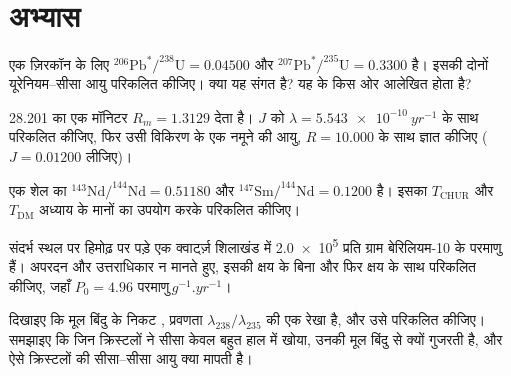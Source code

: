 \section{अभ्यास}

\begin{exercise}[$\star$]\label{exo:b3:advanced-geochronology:1}
एक ज़िरकॉन के लिए $^{206}\mathrm{Pb}^*/^{238}\mathrm{U} = 0.04500$ और
$^{207}\mathrm{Pb}^*/^{235}\mathrm{U} = 0.3300$ है। इसकी दोनों यूरेनियम--सीसा
आयु परिकलित कीजिए। क्या यह संगत है? यह  के किस ओर
आलेखित होता है?
\end{exercise}

\begin{exercise}[$\star$]\label{exo:b3:advanced-geochronology:2}
\qty{28.201}{\Ma} का एक मॉनिटर $R_m = 1.3129$ देता है। $J$ को $\lambda
= \qty{5.543e-10}{yr^{-1}}$ के साथ परिकलित कीजिए, फिर उसी विकिरण के एक
नमूने की आयु, $R = 10.000$ के साथ ज्ञात कीजिए ($J = 0.01200$ लीजिए)।
\end{exercise}

\begin{exercise}[$\star$]\label{exo:b3:advanced-geochronology:3}
एक शेल का $^{143}\mathrm{Nd}/^{144}\mathrm{Nd} = 0.51180$ और
$^{147}\mathrm{Sm}/^{144}\mathrm{Nd} = 0.1200$ है। इसका $T_{\mathrm{CHUR}}$
और $T_{\mathrm{DM}}$ अध्याय के मानों का उपयोग करके परिकलित कीजिए।
\end{exercise}

\begin{exercise}[$\star$]\label{exo:b3:advanced-geochronology:4}
संदर्भ स्थल पर हिमोढ़ पर पड़े एक क्वार्ट्ज़ शिलाखंड में \num{2.0e5}
प्रति ग्राम बेरिलियम-10 के परमाणु हैं। अपरदन और उत्तराधिकार न मानते हुए,
इसकी  क्षय के बिना और फिर क्षय के साथ परिकलित कीजिए, जहाँ $P_0 =
\num{4.96}\text{ परमाणु}\,\unit{g^{-1}.yr^{-1}}$।
\end{exercise}

\begin{exercise}[$\star\star$]\label{exo:b3:advanced-geochronology:5}
दिखाइए कि मूल बिंदु के निकट , प्रवणता
$\lambda_{238}/\lambda_{235}$ की एक रेखा है, और उसे परिकलित कीजिए। समझाइए कि जिन
क्रिस्टलों ने सीसा केवल बहुत हाल में खोया, उनकी  मूल बिंदु से क्यों गुजरती है, और
ऐसे क्रिस्टलों की सीसा--सीसा आयु क्या मापती है।
\end{exercise}


